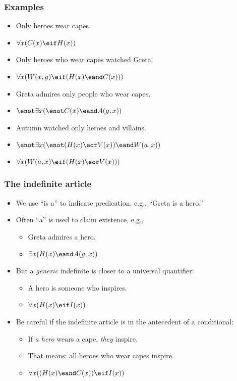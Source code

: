 \begin{frame}
\frametitle{Examples}

\begin{itemize}[<+->]
  \item Only heroes wear capes.\\
  \item[] \alert{$\forall x(C(x) \eif H(x))$}
  \item Only heroes who wear capes watched Greta.\\
  \item[] \alert{$\forall x(W(x,g) \eif (H(x) \eand C(x)))$}
  \item Greta admires only people who wear capes.
  \item[] \alert{$\enot\exists x(\enot  C(x) \eand A(g,x))$}
  \item Autumn watched only heroes and villains.
  \item[] \alert{$\enot\exists x(\enot (H(x) \eor V(x)) \eand W(a,x))$}
  \item[] \alert{$\forall x(W(a,x) \eif (H(x) \eor V(x)))$}
\end{itemize}
\end{frame}

\begin{frame}
\frametitle{The indefinite article}

\begin{itemize}[<+->]
  \item We use ``is a'' to indicate predication, e.g., ``Greta is a hero.''
  \item Often ``a'' is used to claim existence, e.g.,
  \begin{itemize}[<+->]
    \item[] Greta admires a hero.
    \item[] \alert{$\exists x (H(x) \eand A(g, x))$}
  \end{itemize}
  \item But a \emph{generic} indefinite is closer to a
  universal quantifier:
  \begin{itemize}[<+->]
    \item[] A hero is someone who inspires.
    \item[] \alert{$\forall x(H(x) \eif I(x))$}
  \end{itemize}
  \item Be careful if the indefinite article is in the antecedent of a conditional:
  \begin{itemize}[<+->]
    \item[] If \emph{a hero} wears a cape, \emph{they} inspire.
    \item[] That means: all heroes who wear capes inspire.
    \item[] \alert{$\forall x((H(x) \eand C(x)) \eif I(x))$}
  \end{itemize}
\end{itemize}
\end{frame}

